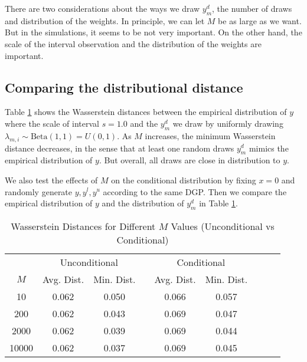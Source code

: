 \documentclass[12pt]{article}
\begin{document}
There are two considerations about the ways we draw \(y^{d}_{m}\), the number of draws and distribution of the weights. In principle, we can let \(M\) be as large as we want. But in the simulations, it seems to be not very important. On the other hand, the scale of the interval observation and the distribution of the weights are important.

\subsection{Comparing the distributional distance}
Table \ref{tab:wasserstein-combined} shows the Wasserstein distances between the empirical distribution of \(y\) where the scale of interval \(s = 1.0\) and the \(y^{d}_{m}\) we draw by uniformly drawing \(\lambda_{m,i}\sim \text{Beta}(1,1) = U(0,1)\). As \(M\) increases, the minimum Wasserstein distance decreases, in the sense that at least one random draws \(y^{d}_{m}\) mimics the empirical distribution of \(y\). But overall, all draws are close in distribution to \(y\).

We also test the effects of \(M\) on the conditional distribution by fixing \(x = 0\) and randomly generate \(y, y^{l}, y^{u}\) according to the same DGP. Then we compare the empirical distribution of \(y\) and the distribution of \(y^{d}_{m}\) in Table \ref{tab:wasserstein-combined}.

\begin{table}[htbp]
    \centering
    \begin{tabular}{ccccccccc}
        \hline
              & \multicolumn{2}{c}{Unconditional} &            & \multicolumn{2}{c}{Conditional}                           \\
        \cline{2-3} \cline{5-6}
        \(M\) & Avg. Dist.                        & Min. Dist. &                                 & Avg. Dist. & Min. Dist. \\
        \hline
        10    & 0.062                             & 0.050      &                                 & 0.066      & 0.057      \\
        200   & 0.062                             & 0.043      &                                 & 0.069      & 0.047      \\
        2000  & 0.062                             & 0.039      &                                 & 0.069      & 0.044      \\
        10000 & 0.062                             & 0.037      &                                 & 0.069      & 0.045      \\
        \hline
    \end{tabular}
    \caption{Wasserstein Distances for Different \(M\) Values (Unconditional vs Conditional)}
    \label{tab:wasserstein-combined}
\end{table}
\end{document}
